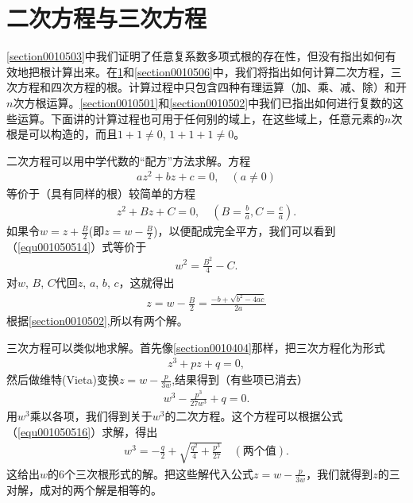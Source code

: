 \section{二次方程与三次方程}\label{section0010505}
\ref{section0010503}中我们证明了任意复系数多项式根的存在性，但没有指出如何有效地把根计算出来。在\ref{section0010505}和\ref{section0010506}中，我们将指出如何计算二次方程，三次方程和四次方程的根。计算过程中只包含四种有理运算（加、乘、减、除）和开$n$次方根运算。\ref{section0010501}和\ref{section0010502}中我们已指出如何进行复数的这些运算。下面讲的计算过程也可用于任何别的域上，在这些域上，任意元素的$n$次根是可以构造的，而且$1+1\neq 0$, $1+1+1\neq 0$。

二次方程可以用中学代数的“配方”方法求解。方程
\begin{gather}\label{equ001050513}
az^2+bz+c=0,\quad(a \neq 0)
\end{gather}
等价于（具有同样的根）较简单的方程
\begin{gather}\label{equ001050514}
z^2+Bz+C=0,\quad(B = \frac{b}{a}, C = \frac{c}{a}).
\end{gather}
如果令$w = z + \frac{B}{2}$(即$z = w - \frac{B}{2}$)，以便配成完全平方，我们可以看到（\ref{equ001050514}）式等价于
\begin{gather}\label{equ001050515}
w^2 = \frac{B^2}{4} - C.
\end{gather}
对$w$, $B$, $C$代回$z$, $a$, $b$, $c$，这就得出
\begin{gather}\label{equ001050516}
z = w - \frac{B}{2} = \frac{-b + \sqrt{b^2 - 4ac}}{2a}
\end{gather}
根据\ref{section0010502},所以有两个解。

三次方程可以类似地求解。首先像\ref{section0010404}那样，把三次方程化为形式
\begin{gather}\label{equ001050517}
z^3 + pz + q = 0,
\end{gather}
然后做维特(Vieta)变换$z = w - \frac{p}{3w}$,结果得到（有些项已消去）
\begin{gather}\label{equ001050518}
w^3 - \frac{p^3}{27w^3} + q = 0.
\end{gather}
用$w^3$乘以各项，我们得到关于$w^3$的二次方程。这个方程可以根据公式（\ref{equ001050516}）求解，得出
\begin{gather}\label{equ001050519}
w^3 = -\frac{q}{2} + \sqrt{\frac{q^2}{4} + \frac{p^3}{27}}\quad (\text{两个值}).
\end{gather}
这给出$w$的6个三次根形式的解。把这些解代入公式$z = w - \frac{p}{3w}$，我们就得到$z$的三对解，成对的两个解是相等的。

